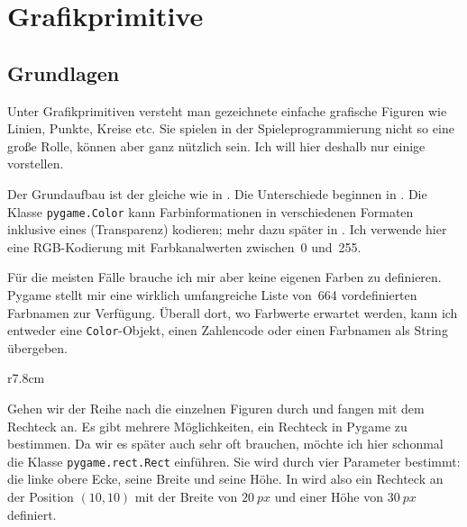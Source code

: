 \newpage
\section{Grafikprimitive}
\subsection{Grundlagen}
Unter Grafikprimitiven versteht man gezeichnete einfache grafische Figuren wie Linien, Punkte, Kreise etc. Sie spielen in der Spieleprogrammierung nicht so eine große Rolle, können aber ganz nützlich sein. Ich will hier deshalb nur einige vorstellen. 


Der Grundaufbau ist der gleiche wie in . Die Unterschiede beginnen in . Die Klasse \texttt{pygame.Color} kann Farbinformationen in verschiedenen Formaten inklusive eines  (Transparenz) kodieren; mehr dazu später in . Ich verwende hier eine RGB-Kodierung mit Farbkanalwerten zwischen~0 und~255. 

Für die meisten Fälle brauche ich mir aber keine eigenen Farben zu definieren. Pygame stellt mir eine wirklich umfangreiche Liste von~664 vordefinierten Farbnamen zur Verfügung. Überall dort, wo Farbwerte erwartet werden, kann ich entweder eine \texttt{Color}-Objekt, einen Zahlencode oder einen Farbnamen als String übergeben.

\begin{wrapfigure}[18]{r}{7.8cm}%
	\begin{center}%
		\vspace{-1cm}%
	\end{center}%
\end{wrapfigure}%
Gehen wir der Reihe nach die einzelnen Figuren durch und fangen mit dem Rechteck an. Es gibt mehrere Möglichkeiten, ein Rechteck in Pygame zu bestimmen. Da wir es später auch sehr oft brauchen, möchte ich hier schonmal die Klasse \texttt{pygame.rect.Rect} einführen. Sie wird durch vier Parameter bestimmt: die linke obere Ecke, seine Breite und seine Höhe. In  wird also ein Rechteck an der Position $(10,10)$ mit der Breite von $20~px$ und einer Höhe von $30~px$ definiert. 

